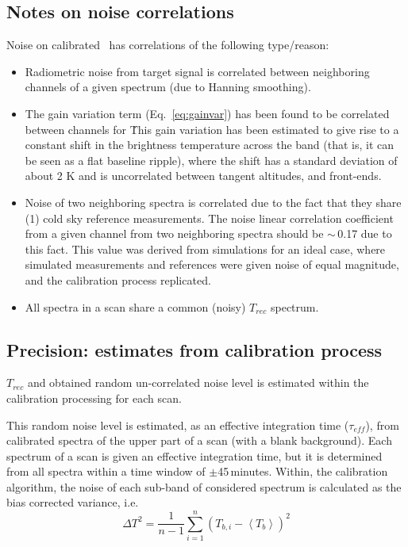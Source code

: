\subsection{Notes on noise correlations}
\label{notesoncorr}

Noise on calibrated \smr\ has correlations of the following type/reason:

\begin{itemize}

\item Radiometric noise from target signal is correlated between 
neighboring channels of a given spectrum (due to Hanning smoothing).

\item The gain variation term (Eq.~\ref{eq:gainvar}) has been found to be correlated 
between channels for \smr\.
This gain variation has been estimated to give rise to a constant
shift in the brightness temperature across the band (that is, it can 
be seen as a flat baseline ripple), where the shift
has a standard deviation of about 2 K and is uncorrelated
between tangent altitudes, and front-ends.

\item Noise of two neighboring spectra is correlated due to
the fact that they share (1) cold sky reference measurements. 
The noise linear correlation coefficient from a given channel
from two neighboring spectra should be \(\sim\)\,0.17 due to this
fact. This value was derived from simulations for an ideal
case, where simulated measurements and references were 
given noise of equal magnitude, and the calibration
process replicated.

\item All spectra in a scan share a common (noisy) \(T_{rec}\)
spectrum. 

\end{itemize}

\subsection{Precision: estimates from calibration process}
\label{sec:caluncer}

\(T_{rec}\) and obtained random un-correlated noise level is estimated within the 
calibration processing for each scan.


This random noise level is estimated, as an effective integration time
(\(\tau_{eff}\)), from calibrated spectra of the upper part of a scan 
(with a blank background). Each spectrum of a scan is given an effective
integration time, but it is determined from all spectra within a time
window of \(\pm\)45\,minutes. 
Within, the calibration algorithm, the noise of each sub-band of
considered spectrum is calculated as the bias corrected variance, i.e.
\begin{equation}
\Delta T^{2} = \frac{1}{n-1}\sum_{i=1}^{n}(T_{b,i}-\left<T_{b}\right>)^{2}
\end{equation}

